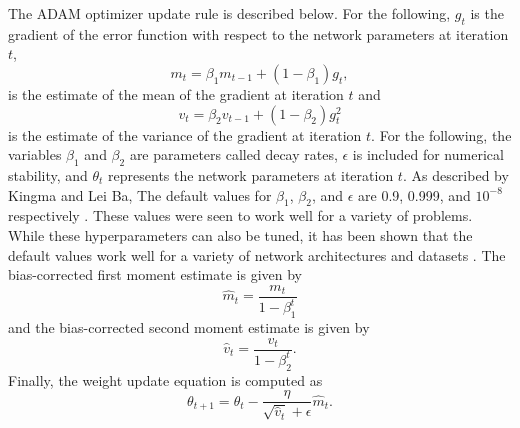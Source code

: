 The ADAM optimizer update rule is described below. For the following, $g_t$ is the gradient of the error function with respect to the network parameters at iteration $t$, 
\begin{equation} \label{eq:adam1}
m_t = \beta_1 m_{t-1} + (1 - \beta_1) g_t,
\end{equation}
is the estimate of the mean of the gradient at iteration $t$ and
\begin{equation} \label{eq:adam2}
v_t = \beta_2 v_{t-1} + (1 - \beta_2) g_t^2
\end{equation}
is the estimate of the variance of the gradient at iteration $t$. For the following, the variables $\beta_1$ and $\beta_2$ are parameters called decay rates, $\epsilon$ is included for numerical stability, and $\theta_t$ represents the network parameters at iteration $t$. As described by Kingma and Lei Ba, The default values for $\beta_1$, $\beta_2$, and $\epsilon$ are 0.9, 0.999, and $10^{-8}$ respectively \cite{Kingma2015}. These values were seen to work well for a variety of problems. While these hyperparameters can also be tuned, it has been shown that the default values work well for a variety of network architectures and datasets \cite{Kingma2015}. The bias-corrected first moment estimate is given by
\begin{equation} \label{eq:adam3}
\hat{m}_t = \dfrac{m_t}{1 - \beta^t_1}
\end{equation}
and the bias-corrected second moment estimate is given by 
\begin{equation} \label{eq:adam4}
\hat{v}_t = \dfrac{v_t}{1 - \beta^t_2}.
\end{equation}
Finally, the weight update equation is computed as
\begin{equation} \label{eq:adam5}
\theta_{t+1} = \theta_{t} - \dfrac{\eta}{\sqrt{\hat{v}_t} + \epsilon} \hat{m}_t.
\end{equation}





